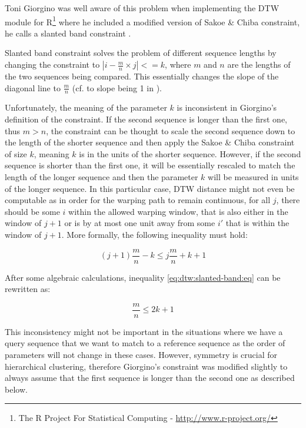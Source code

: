 \documentclass[parskip]{cs4rep}
\begin{document}
Toni Giorgino \nocite{Giorgino:2009ue} was well aware of this problem when implementing the DTW module for R\footnote{The R Project For Statistical Computing - \url{http://www.r-project.org/}} where he included a modified version of Sakoe \& Chiba constraint, he calls a slanted band constraint \citep{Giorgino:2009ue}. 

Slanted band constraint solves the problem of different sequence lengths by changing the constraint to 
$|i - \frac{m}{n} \times j| <= k$, where $m$ and $n$ are the lengths of the two sequences being compared. This essentially changes the slope of the diagonal line to $\frac{m}{n}$ (cf. to slope being 1 in \citep{Sakoe:1978ta}).

Unfortunately, the meaning of the parameter $k$ is inconsistent in Giorgino's definition of the constraint. If the second sequence is longer than the first one, thus $m > n$, the constraint can be thought to scale the second sequence down to the length of the shorter sequence and then apply the Sakoe \& Chiba constraint of size $k$, meaning $k$ is in the units of the shorter sequence. However, if the second sequence is shorter than the first one, it will be essentially rescaled to match the length of the longer sequence and then the parameter $k$ will be measured in units of the longer sequence. In this particular case, DTW distance might not even be computable as in order for the warping path to remain continuous, for all $j$, there should be some $i$ within the allowed warping window, that is also either in the window of $j+1$ or is by at most one unit away from some $i'$ that is within the window of $j+1$. More formally, the following inequality must hold: 

\begin{equation}\label{eq:dtw:slanted-band:eq}
(j+1) \frac{m}{n} - k \le j \frac{m}{n} + k + 1
\end{equation}

After some algebraic calculations, inequality \ref{eq:dtw:slanted-band:eq} can be rewritten as:

\begin{equation}
\frac{m}{n} \le 2k + 1
\end{equation}

This inconsistency might not be important in the situations where we have a query sequence that we want to match to a reference sequence as the order of parameters will not change in these cases. However, symmetry is crucial for hierarchical clustering, therefore Giorgino's constraint was modified slightly to always assume that the first sequence is longer than the second one as described below.
\end{document}
